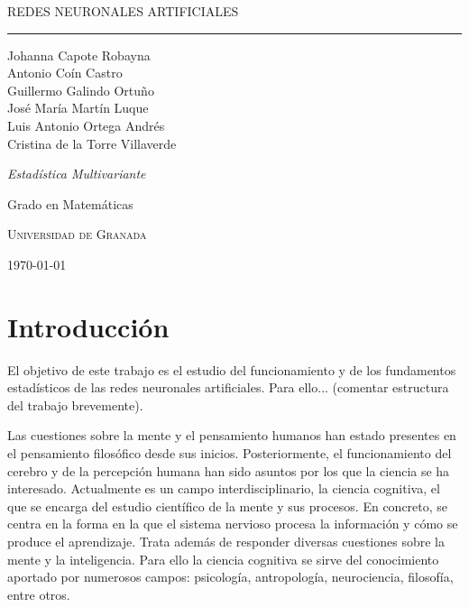 \documentclass[
  a4paper,
  12pt,
  spanish,
]{scrartcl}
\DeclareRobustCommand{\spacedallcaps}[1]{{\linespread{1.3}\sacshape\MakeTextUppercase{#1}}}%
\theoremstyle{teorema-style}
\newcommand{\horrule}[1]{\rule{\linewidth}{#1}}
\begin{document}
\begin{titlepage}
  \vspace*{4cm}

  \begin{flushleft}
    \Huge
    \spacedallcaps{Redes neuronales artificiales}
    \horrule{2pt}
  \end{flushleft}

  \vspace{2em}

  \begin{flushright}
    \large
    Johanna Capote Robayna\\
    Antonio Coín Castro\\
    Guillermo Galindo Ortuño\\
    José María Martín Luque\\
    Luis Antonio Ortega Andrés\\
    Cristina de la Torre Villaverde
    \vspace{1em}

    \textit{Estadística Multivariante}

    Grado en Matemáticas

    \textsc{Universidad de Granada}\vspace{1em}

    \today\vspace{.5em}
  \end{flushright}
\end{titlepage}

\newpage

{\hypersetup{hidelinks}
\tableofcontents
}

\newpage

\section{Introducción}

El objetivo de este trabajo es el estudio del funcionamiento y de los fundamentos estadísticos de las redes neuronales artificiales.
Para ello... (comentar estructura del trabajo brevemente).

Las cuestiones sobre la mente y el pensamiento humanos han estado presentes en el pensamiento filosófico desde sus inicios.
Posteriormente, el funcionamiento del cerebro y de la percepción humana han sido asuntos por los que la ciencia se ha interesado.
Actualmente es un campo interdisciplinario, la ciencia cognitiva, el que se encarga del estudio científico de la mente y sus procesos.
En concreto, se centra en la forma en la que el sistema nervioso procesa la información y cómo se produce el aprendizaje.
Trata además de responder diversas cuestiones sobre la mente y la inteligencia.
Para ello la ciencia cognitiva se sirve del conocimiento aportado por numerosos campos: psicología, antropología, neurociencia, filosofía, entre otros.
\end{document}

